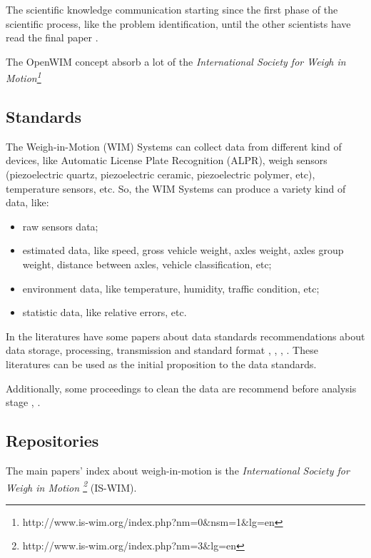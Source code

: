 \documentclass[a4paper]{article}
\begin{document}
{The scientific knowledge communication starting since the first phase of the scientific process, like the problem identification, until the other scientists have read the final paper \cite{leite2007scientific}.

The OpenWIM concept absorb a lot of the \textit{International Society for Weigh in Motion\footnote{http://www.is-wim.org/index.php?nm=0$\&$nsm=1$\&$lg=en}}

\subsection{Standards}\label{standards}

The Weigh-in-Motion (WIM) Systems can collect data from different kind of devices, like Automatic License Plate Recognition (ALPR), weigh sensors (piezoelectric quartz, piezoelectric ceramic, piezoelectric polymer, etc), temperature sensors, etc. So, the WIM Systems can produce a variety kind of data, like:

\begin{itemize}
\item raw sensors data;
\item estimated data, like speed, gross vehicle weight, axles weight, axles group weight, distance between axles, vehicle classification, etc;
\item environment data, like temperature, humidity, traffic condition, etc;
\item statistic data, like relative errors, etc.
\end{itemize}

In the literatures have some papers about data standards recommendations about data storage, processing, transmission and standard format \cite{tech:cost-323}, \cite{enright2011cleaning}, \cite{qu1997traffic}, \cite{elkins2008development}. These literatures can be used as the initial proposition to the data standards.

Additionally, some proceedings to clean the data are recommend before analysis stage \cite{elkins2008development}, \cite{enright2011cleaning}.


\subsection{Repositories}\label{repositories}

The main papers' index	about weigh-in-motion is the \textit{International Society for Weigh in Motion \footnote{http://www.is-wim.org/index.php?nm=3$\&$lg=en}} (IS-WIM).

}
\end{document}
